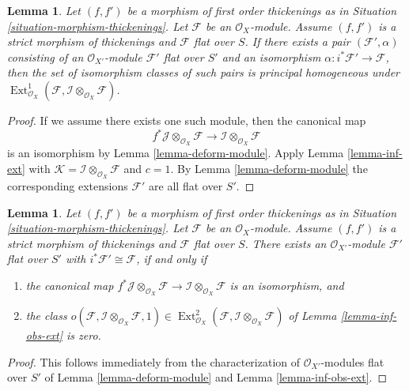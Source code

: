 \documentclass{stacks-project}
\theoremstyle{plain}
\newtheorem{lemma}[subsection]{Lemma}
\theoremstyle{definition}
\theoremstyle{remark}
\numberwithin{equation}{subsection}
\def\Ext{\mathop{\mathrm{Ext}}\nolimits}
\begin{document}
\begin{lemma}
\label{lemma-inf-ext-rel}
Let $(f, f')$ be a morphism of first order thickenings as in
Situation \ref{situation-morphism-thickenings}.
Let $\mathcal{F}$ be an $\mathcal{O}_X$-module.
Assume $(f, f')$ is a strict morphism of thickenings and
$\mathcal{F}$ flat over $S$. If there exists a pair
$(\mathcal{F}', \alpha)$ consisting of an
$\mathcal{O}_{X'}$-module $\mathcal{F}'$ flat over $S'$ and an isomorphism
$\alpha : i^*\mathcal{F}' \to \mathcal{F}$, then the set of
isomorphism classes of such pairs is principal homogeneous
under
$\Ext^1_{\mathcal{O}_X}(
\mathcal{F}, \mathcal{I} \otimes_{\mathcal{O}_X} \mathcal{F})$.
\end{lemma}

\begin{proof}
If we assume there exists one such module, then the canonical map
$$
f^*\mathcal{J} \otimes_{\mathcal{O}_X} \mathcal{F} \to
\mathcal{I} \otimes_{\mathcal{O}_X} \mathcal{F}
$$
is an isomorphism by Lemma \ref{lemma-deform-module}. Apply
Lemma \ref{lemma-inf-ext} with $\mathcal{K} = 
\mathcal{I} \otimes_{\mathcal{O}_X} \mathcal{F}$
and $c = 1$. By Lemma \ref{lemma-deform-module} the corresponding extensions
$\mathcal{F}'$ are all flat over $S'$.
\end{proof}

\begin{lemma}
\label{lemma-inf-obs-ext-rel}
Let $(f, f')$ be a morphism of first order thickenings as in
Situation \ref{situation-morphism-thickenings}.
Let $\mathcal{F}$ be an $\mathcal{O}_X$-module. Assume
$(f, f')$ is a strict morphism of thickenings
and $\mathcal{F}$ flat over $S$. There exists an
$\mathcal{O}_{X'}$-module $\mathcal{F}'$ flat over $S'$ with
$i^*\mathcal{F}' \cong \mathcal{F}$, if and only if
\begin{enumerate}
\item the canonical map $
f^*\mathcal{J} \otimes_{\mathcal{O}_X} \mathcal{F} \to
\mathcal{I} \otimes_{\mathcal{O}_X} \mathcal{F}$
is an isomorphism, and
\item the class
$o(\mathcal{F}, \mathcal{I} \otimes_{\mathcal{O}_X} \mathcal{F}, 1)
\in \Ext^2_{\mathcal{O}_X}(
\mathcal{F}, \mathcal{I} \otimes_{\mathcal{O}_X} \mathcal{F})$
of Lemma \ref{lemma-inf-obs-ext} is zero.
\end{enumerate}
\end{lemma}

\begin{proof}
This follows immediately from the characterization of
$\mathcal{O}_{X'}$-modules flat over $S'$ of 
Lemma \ref{lemma-deform-module} and
Lemma \ref{lemma-inf-obs-ext}.
\end{proof}
\end{document}
